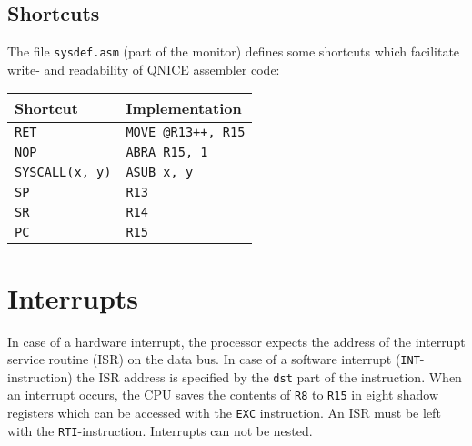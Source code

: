 \documentclass{leaflet}
\begin{document}
  \subsection{Shortcuts}
   The file \texttt{sysdef.asm} (part of the monitor) defines some shortcuts
   which facilitate write- and readability of QNICE assembler code:
   \vspace*{-3mm}
   \begin{center}
{\scriptsize
    \begin{longtable}{|l|l|}
     \hline
      Shortcut&Implementation\\
     \hline
     \hline
      \texttt{RET}&\texttt{MOVE @R13++, R15}\\
      \texttt{NOP}&\texttt{ABRA R15, 1}\\
      \texttt{SYSCALL(x, y)}&\texttt{ASUB x, y}\\
     \hline
      \texttt{SP}&\texttt{R13}\\
      \texttt{SR}&\texttt{R14}\\
      \texttt{PC}&\texttt{R15}\\
     \hline
    \end{longtable}
}
   \end{center}
   \vspace*{-15mm}
%
 \section{Interrupts}
  In case of a hardware interrupt, the processor expects the address of the 
  interrupt service routine (ISR) on the data bus. In case of a software
  interrupt (\texttt{INT}-instruction) the ISR address is specified by the 
  \texttt{dst} part of the instruction. When an interrupt occurs, the CPU
  saves the contents of \texttt{R8} to \texttt{R15} in eight shadow registers
  which can be accessed with the \texttt{EXC} instruction. An ISR must be 
  left with the \texttt{RTI}-instruction. Interrupts can not be nested.
%
\end{document}

